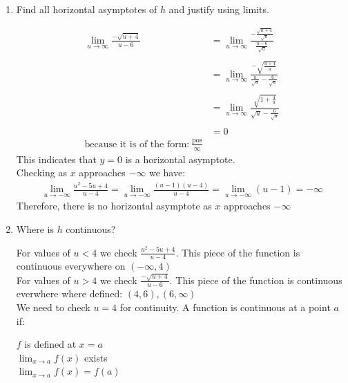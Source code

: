 \documentclass[nooutcomes,handout]{ximera}
\begin{document}
\begin{problem}
\begin{enumerate}
	\item Find all horizontal asymptotes of $h$ and justify using limits.
	\begin{freeResponse}
	\begin{align*}
	\lim_{u \to \infty}\frac{-\sqrt{u+4}}{u - 6}&=\lim_{u \to \infty}\frac{-\frac{\sqrt{u+4}}{\sqrt{u}}}{\frac{u - 6}{\sqrt{u}}}\\ \\
	&=\lim_{u \to \infty}\frac{-\sqrt{\frac{u+4}{u}}}{\frac{u}{\sqrt{u}} - \frac{6}{\sqrt{u}}}\\ \\
	&=\lim_{u \to \infty}\frac{\sqrt{1+\frac{4}{u}}}{\sqrt{u} - \frac{6}{\sqrt{u}}}\\ \\
	&=0\\ \text{because it is of the form:}\ \frac{\text{pos}}{\infty}
	\end{align*}
	This indicates that $y=0$ is a horizontal asymptote.\\
	Checking as $x$ approaches $-\infty$ we have:
	\begin{align*}
	\lim_{u \to -\infty}\frac{u^2-5u+4}{u - 4}=\lim_{u \to -\infty} \frac{(u-1)(u-4)}{u - 4}=\lim_{u \to -\infty} (u-1)= -\infty
	\end{align*}
 Therefore, there is no horizontal asymptote as $x$ approaches $-\infty$
	
	\end{freeResponse}

	\item Where is $h$ continuous?

	\begin{freeResponse}
		For values of $u<4$ we check $\frac{u^2-5u+4}{u - 4}$.  This piece of the function is continuous everywhere on $(-\infty,4)$ \\
	For values of $u>4$ we check $\frac{-\sqrt{u+4}}{u - 6}$. This piece of the function is continuous everwhere where defined: $(4,6),(6,\infty)$\\

	We need to check $u=4$ for continuity. A function is continuous at a point $a$ if:
	\begin{center}
	  $f$ is defined at $x = a$\\

     	 $\lim_{x \to a} f(x)$ exists\\

    	  $\lim_{x \to a} f(x) = f(a)$
	\end{center}


\end{freeResponse}
\end{enumerate}
\end{problem}
\end{document}
